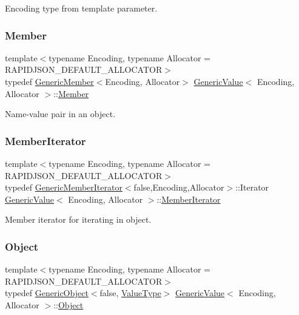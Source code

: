 Encoding type from template parameter. 

\mbox{\label{classGenericValue_a7ccf27c44058b4c11c3efc6473afb886}} 
\subsubsection{\texorpdfstring{Member}{Member}}
{\footnotesize\ttfamily template$<$typename Encoding, typename Allocator = R\+A\+P\+I\+D\+J\+S\+O\+N\+\_\+\+D\+E\+F\+A\+U\+L\+T\+\_\+\+A\+L\+L\+O\+C\+A\+T\+OR$>$ \\
typedef \hyperlink{classGenericMember}{Generic\+Member}$<$Encoding, Allocator$>$ \hyperlink{classGenericValue}{Generic\+Value}$<$ Encoding, Allocator $>$\+::\hyperlink{classGenericValue_a7ccf27c44058b4c11c3efc6473afb886}{Member}}



Name-\/value pair in an object. 

\mbox{\label{classGenericValue_a349b8faae61edc42b4289726820be439}} 
\subsubsection{\texorpdfstring{Member\+Iterator}{MemberIterator}}
{\footnotesize\ttfamily template$<$typename Encoding, typename Allocator = R\+A\+P\+I\+D\+J\+S\+O\+N\+\_\+\+D\+E\+F\+A\+U\+L\+T\+\_\+\+A\+L\+L\+O\+C\+A\+T\+OR$>$ \\
typedef \hyperlink{classGenericMemberIterator}{Generic\+Member\+Iterator}$<$false,Encoding,Allocator$>$\+::Iterator \hyperlink{classGenericValue}{Generic\+Value}$<$ Encoding, Allocator $>$\+::\hyperlink{classGenericValue_a349b8faae61edc42b4289726820be439}{Member\+Iterator}}



Member iterator for iterating in object. 

\mbox{\label{classGenericValue_aee3606d69d411ce0d98f29639585989b}} 
\subsubsection{\texorpdfstring{Object}{Object}}
{\footnotesize\ttfamily template$<$typename Encoding, typename Allocator = R\+A\+P\+I\+D\+J\+S\+O\+N\+\_\+\+D\+E\+F\+A\+U\+L\+T\+\_\+\+A\+L\+L\+O\+C\+A\+T\+OR$>$ \\
typedef \hyperlink{classGenericObject}{Generic\+Object}$<$false, \hyperlink{classGenericValue_a43a39bb4fca9b9d3de3da6ac353d25ce}{Value\+Type}$>$ \hyperlink{classGenericValue}{Generic\+Value}$<$ Encoding, Allocator $>$\+::\hyperlink{classGenericValue_aee3606d69d411ce0d98f29639585989b}{Object}}

